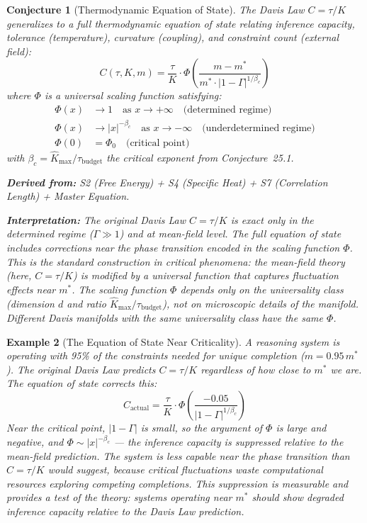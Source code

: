 \documentclass[11pt,letterpaper]{article}
\newtheorem{conjecture}{Conjecture}[section]
\newtheorem{example}[conjecture]{Example}
\newcommand{\Khat}{\hat{K}}
\newcommand{\tbudget}{\tau_{\mathrm{budget}}}
\begin{document}
\begin{conjecture}[Thermodynamic Equation of State]\label{conj:eos}
The Davis Law $C = \tau / K$ generalizes to a full thermodynamic equation 
of state relating inference capacity, tolerance (temperature), curvature 
(coupling), and constraint count (external field):
\begin{equation}\label{eq:full_eos}
    C(\tau, K, m) = \frac{\tau}{K} \cdot 
    \Phi\left(\frac{m - m^*}{m^* \cdot |1 - \Gamma|^{1/\beta_c}}\right)
\end{equation}
where $\Phi$ is a universal scaling function satisfying:
\begin{align}
    \Phi(x) &\to 1 \quad \text{as } x \to +\infty 
    \quad \text{(determined regime)} \\
    \Phi(x) &\to |x|^{-\beta_c} \quad \text{as } x \to -\infty 
    \quad \text{(underdetermined regime)} \\
    \Phi(0) &= \Phi_0 \quad \text{(critical point)}
\end{align}
with $\beta_c = \Khat_{\max} / \tbudget$ the critical exponent from 
Conjecture~25.1.

\textbf{Derived from:} S2 (Free Energy) + S4 (Specific Heat) + S7 
(Correlation Length) + Master Equation.

\textbf{Interpretation:} The original Davis Law $C = \tau/K$ is exact only 
in the determined regime ($\Gamma \gg 1$) and at mean-field level. The 
full equation of state includes corrections near the phase transition 
encoded in the scaling function $\Phi$. This is the standard construction 
in critical phenomena: the mean-field theory (here, $C = \tau/K$) is 
modified by a universal function that captures fluctuation effects near 
$m^*$. The scaling function $\Phi$ depends only on the universality class 
(dimension $d$ and ratio $\Khat_{\max}/\tbudget$), not on microscopic 
details of the manifold. Different Davis manifolds with the same 
universality class have the same $\Phi$.
\end{conjecture}

\begin{example}[The Equation of State Near Criticality]
A reasoning system is operating with 95\% of the constraints needed for 
unique completion ($m = 0.95 \, m^*$). The original Davis Law predicts 
$C = \tau/K$ regardless of how close to $m^*$ we are. The equation of 
state corrects this:
\begin{equation}
    C_{\mathrm{actual}} = \frac{\tau}{K} \cdot 
    \Phi\left(\frac{-0.05}{|1 - \Gamma|^{1/\beta_c}}\right)
\end{equation}
Near the critical point, $|1 - \Gamma|$ is small, so the argument of 
$\Phi$ is large and negative, and $\Phi \sim |x|^{-\beta_c}$ --- the 
inference capacity is suppressed relative to the mean-field prediction. 
The system is \emph{less capable} near the phase transition than $C = 
\tau/K$ would suggest, because critical fluctuations waste computational 
resources exploring competing completions. This suppression is measurable 
and provides a test of the theory: systems operating near $m^*$ should 
show degraded inference capacity relative to the Davis Law prediction.
\end{example}
\end{document}

